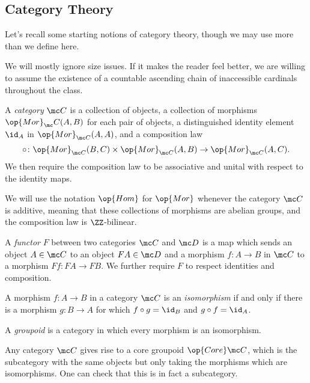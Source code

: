 \documentclass[../notes.tex]{subfiles}
\begin{document}
\subsection{Category Theory}
Let's recall some starting notions of category theory, though we may use more than we define here.
\begin{warn}
	We will mostly ignore size issues. If it makes the reader feel better, we are willing to assume the existence of a countable ascending chain of inaccessible cardinals throughout the class.
\end{warn}
\begin{definition}[category]
	A \textit{category} $\mc C$ is a collection of objects, a collection of morphisms $\op{Mor}_\mc C(A,B)$ for each pair of objects, a distinguished identity element $\id_A$ in $\op{Mor}_{\mc C}(A,A)$, and a composition law
	\[\circ\colon\op{Mor}_{\mc C}(B,C)\times\op{Mor}_{\mc C}(A,B)\to\op{Mor}_{\mc C}(A,C).\]
	We then require the composition law to be associative and unital with respect to the identity maps.
\end{definition}
\begin{remark}
	We will use the notation $\op{Hom}$ for $\op{Mor}$ whenever the category $\mc C$ is additive, meaning that these collections of morphisms are abelian groups, and the composition law is $\ZZ$-bilinear.
\end{remark}
\begin{definition}[functor]
	A \textit{functor} $F$ between two categories $\mc C$ and $\mc D$ is a map which sends an object $A\in\mc C$ to an object $FA\in\mc D$ and a morphism $f\colon A\to B$ in $\mc C$ to a morphism $Ff\colon FA\to FB$. We further require $F$ to respect identities and composition.
\end{definition}
\begin{definition}[isomorphism]
	A morphism $f\colon A\to B$ in a category $\mc C$ is an \textit{isomorphism} if and only if there is a morphism $g\colon B\to A$ for which $f\circ g=\id_B$ and $g\circ f=\id_A$.
\end{definition}
\begin{definition}[groupoid]
	A \textit{groupoid} is a category in which every morphism is an isomorphism.
\end{definition}
\begin{example}
	Any category $\mc C$ gives rise to a core groupoid $\op{Core}\mc C$, which is the subcategory with the same objects but only taking the morphisms which are isomorphisms. One can check that this is in fact a subcategory.
\end{example}
\end{document}
